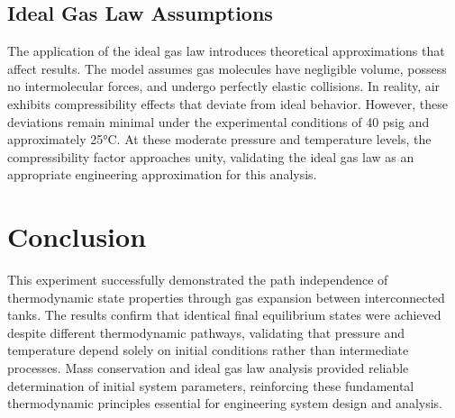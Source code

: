 \documentclass{article} %
\begin{document}
\begin{multicols}{2}
\subsection{Ideal Gas Law Assumptions}
The application of the ideal gas law introduces theoretical approximations that affect results. The model assumes gas molecules have negligible volume, possess no intermolecular forces, and undergo perfectly elastic collisions. In reality, air exhibits compressibility effects that deviate from ideal behavior. However, these deviations remain minimal under the experimental conditions of 40 psig and approximately 25°C. At these moderate pressure and temperature levels, the compressibility factor approaches unity, validating the ideal gas law as an appropriate engineering approximation for this analysis.

\section{Conclusion}
\label{conclusion}

This experiment successfully demonstrated the path independence of thermodynamic state properties through gas expansion between interconnected tanks. 
The results confirm that identical final equilibrium states were achieved despite different thermodynamic pathways, validating that pressure and temperature depend solely on initial conditions rather than intermediate processes. 
Mass conservation and ideal gas law analysis provided reliable determination of initial system parameters, reinforcing these fundamental thermodynamic principles essential for engineering system design and analysis.

\label{last_page}

\newpage


    
\end{multicols}
\end{document}
